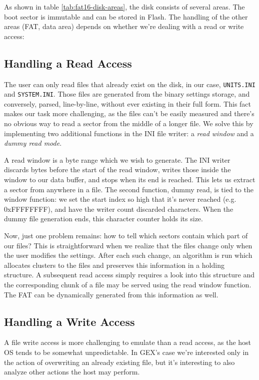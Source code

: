 As shown in table \ref{tab:fat16-disk-areas}, the disk consists of several areas. The boot sector is immutable and can be stored in Flash. The handling of the other areas (FAT, data area) depends on whether we're dealing with a read or write access:

\subsection{Handling a Read Access}

The user can only read files that already exist on the disk, in our case, \verb|UNITS.INI| and \verb|SYSTEM.INI|. Those files are generated from the binary settings storage, and conversely, parsed, line-by-line, without ever existing in their full form. This fact makes our task more challenging, as the files can't be easily measured and there's no obvious way to read a sector from the middle of a longer file. We solve this by implementing two additional functions in the INI file writer: a \textit{read window} and a \textit{dummy read mode}.

A read window is a byte range which we wish to generate. The INI writer discards bytes before the start of the read window, writes those inside the window to our data buffer, and stops when its end is reached. This lets us extract a sector from anywhere in a file. The second function, dummy read, is tied to the window function: we set the start index so high that it's never reached (e.g. 0xFFFFFFFF), and have the writer count discarded characters. When the dummy file generation ends, this character counter holds its size.

Now, just one problem remains: how to tell which sectors contain which part of our files? This is straightforward when we realize that the files change only when the user modifies the settings. After each such change, an algorithm is run which allocates clusters to the files and preserves this information in a holding structure. A subsequent read access simply requires a look into this structure and the corresponding chunk of a file may be served using the read window function. The FAT can be dynamically generated from this information as well.

\subsection{Handling a Write Access}

A file write access is more challenging to emulate than a read access, as the host OS tends to be somewhat unpredictable. In GEX's case we're interested only in the action of overwriting an already existing file, but it's interesting to also analyze other actions the host may perform. 

